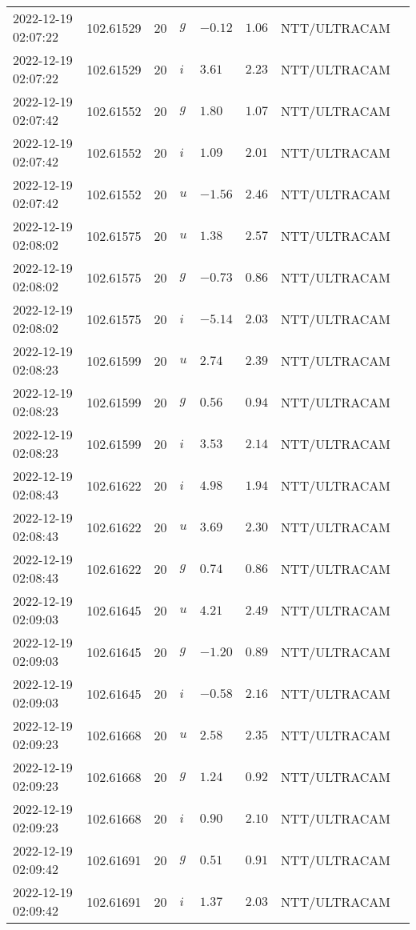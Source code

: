 \documentclass{nature_plusfigure}
\begin{document}
\begin{supplement}
\begin{center}
\begin{longtable}{llllllll}
2022-12-19 02:07:22 & 102.61529 & 20 & $g$ & $-0.12$ & $1.06$ & NTT/ULTRACAM &  \\ 
2022-12-19 02:07:22 & 102.61529 & 20 & $i$ & $3.61$ & $2.23$ & NTT/ULTRACAM &  \\ 
2022-12-19 02:07:42 & 102.61552 & 20 & $g$ & $1.80$ & $1.07$ & NTT/ULTRACAM &  \\ 
2022-12-19 02:07:42 & 102.61552 & 20 & $i$ & $1.09$ & $2.01$ & NTT/ULTRACAM &  \\ 
2022-12-19 02:07:42 & 102.61552 & 20 & $u$ & $-1.56$ & $2.46$ & NTT/ULTRACAM &  \\ 
2022-12-19 02:08:02 & 102.61575 & 20 & $u$ & $1.38$ & $2.57$ & NTT/ULTRACAM &  \\ 
2022-12-19 02:08:02 & 102.61575 & 20 & $g$ & $-0.73$ & $0.86$ & NTT/ULTRACAM &  \\ 
2022-12-19 02:08:02 & 102.61575 & 20 & $i$ & $-5.14$ & $2.03$ & NTT/ULTRACAM &  \\ 
2022-12-19 02:08:23 & 102.61599 & 20 & $u$ & $2.74$ & $2.39$ & NTT/ULTRACAM &  \\ 
2022-12-19 02:08:23 & 102.61599 & 20 & $g$ & $0.56$ & $0.94$ & NTT/ULTRACAM &  \\ 
2022-12-19 02:08:23 & 102.61599 & 20 & $i$ & $3.53$ & $2.14$ & NTT/ULTRACAM &  \\ 
2022-12-19 02:08:43 & 102.61622 & 20 & $i$ & $4.98$ & $1.94$ & NTT/ULTRACAM &  \\ 
2022-12-19 02:08:43 & 102.61622 & 20 & $u$ & $3.69$ & $2.30$ & NTT/ULTRACAM &  \\ 
2022-12-19 02:08:43 & 102.61622 & 20 & $g$ & $0.74$ & $0.86$ & NTT/ULTRACAM &  \\ 
2022-12-19 02:09:03 & 102.61645 & 20 & $u$ & $4.21$ & $2.49$ & NTT/ULTRACAM &  \\ 
2022-12-19 02:09:03 & 102.61645 & 20 & $g$ & $-1.20$ & $0.89$ & NTT/ULTRACAM &  \\ 
2022-12-19 02:09:03 & 102.61645 & 20 & $i$ & $-0.58$ & $2.16$ & NTT/ULTRACAM &  \\ 
2022-12-19 02:09:23 & 102.61668 & 20 & $u$ & $2.58$ & $2.35$ & NTT/ULTRACAM &  \\ 
2022-12-19 02:09:23 & 102.61668 & 20 & $g$ & $1.24$ & $0.92$ & NTT/ULTRACAM &  \\ 
2022-12-19 02:09:23 & 102.61668 & 20 & $i$ & $0.90$ & $2.10$ & NTT/ULTRACAM &  \\ 
2022-12-19 02:09:42 & 102.61691 & 20 & $g$ & $0.51$ & $0.91$ & NTT/ULTRACAM &  \\ 
2022-12-19 02:09:42 & 102.61691 & 20 & $i$ & $1.37$ & $2.03$ & NTT/ULTRACAM &  \\ 

\end{longtable}
\end{center}
\end{supplement}
\end{document}
